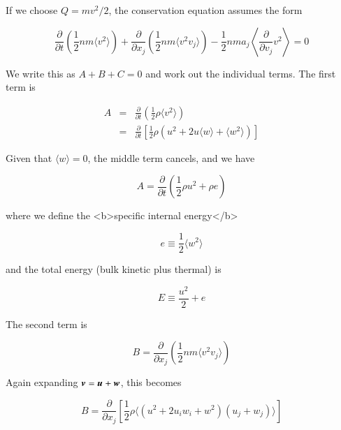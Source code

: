 \noindent If we choose $Q = mv^2/2$, the conservation equation assumes the form


\begin{equation}
\frac{\partial }{\partial t} \left(\frac{1}{2}n m \langle v^2 \rangle\right) + \frac{\partial}{\partial x_j}\left(\frac{1}{2}nm\langle v^2v_j \rangle\right) - \frac{1}{2}nma_j \left\langle \frac{\partial}{\partial v_j} v^2 \right\rangle = 0 
\end{equation}

\noindent We write this as $A+B+C=0$ and work out the individual terms. The first term is 

\begin{eqnarray}
A &=& \frac{\partial }{\partial t} \left(\frac{1}{2}\rho \langle v^2 \rangle\right)\\
&=& \frac{\partial }{\partial t} \left[\frac{1}{2}\rho \left(u^2 + 2u\langle w \rangle + \langle w^2 \rangle\right)\right]
\end{eqnarray}

\noindent Given that $\langle w \rangle = 0$, the middle term cancels, and we have 

\begin{equation}
A = \frac{\partial }{\partial t} \left(\frac{1}{2}\rho u^2 + \rho e \right)
\end{equation}

\noindent where we define the <b>specific internal energy</b>

\begin{equation}
e \equiv \frac{1}{2} \langle w^2\rangle
\end{equation}

\noindent and the total energy (bulk kinetic plus thermal) is 

\begin{equation}
E \equiv \frac{u^2}{2} + e 
\end{equation}

\noindent The second term is 

\begin{equation}
B = \frac{\partial}{\partial x_j}\left(\frac{1}{2}nm\langle v^2v_j \rangle\right)
\end{equation}

\noindent Again expanding ${\boldsymbol{v}} = {\boldsymbol{u}} + {\boldsymbol{w}}$, this becomes  

\begin{equation}
B = \frac{\partial}{\partial x_j}\left[\frac{1}{2}\rho\langle (u^2 + 2u_iw_i + w^2)(u_j + w_j) \rangle\right]
\end{equation}


